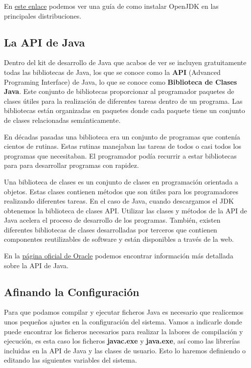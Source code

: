 En \href{https://www.muylinux.com/2021/03/23/adoptium-working-group-adoptopenjdk-eclipse-foundation-openjdk/}{este enlace} podemos ver una guía de como instalar OpenJDK en las principales distribuciones.

\subsection{La API de Java}
Dentro del kit de desarrollo de Java que acabos de ver se incluyen gratuitamente todas las bibliotecas de Java, los que se conoce como la \textbf{API} (Advanced Programing Interface) de Java, lo que se conoce como \textbf{Biblioteca de Clases Java}. Este conjunto de bibliotecas proporcionar al programador paquetes de clases útiles para la realización de diferentes tareas dentro de un programa. Las bibliotecas están organizadas en paquetes donde cada paquete tiene un conjunto de clases relacionadas semánticamente.

En décadas pasadas una biblioteca era un conjunto de programas que contenía cientos de rutinas. Estas rutinas manejaban las tareas de todos o casi todos los programas que necesitaban. El programador podía recurrir a estar bibliotecas para para desarrollar programas con rapidez.

Una biblioteca de clases es un conjunto de clases en programación orientada a objetos. Estas clases contienen métodos que son útiles para los programadores realizando diferentes tareas. En el caso de Java, cuando descargamos el JDK obtenemos la biblioteca de clases API. Utilizar las clases y métodos de la API de Java acelera el proceso de desarrollo de los programas. También, existen diferentes bibliotecas de clases desarrolladas por terceros que contienen componentes reutilizables de software y están disponibles a través de la web.

En la \href{https://docs.oracle.com/en/java/javase/index.html}{página oficial de Oracle} podemos encontrar información más detallada sobre la API de Java.

\subsection{Afinando la Configuración}
Para que podamos compilar y ejecutar ficheros Java es necesario que realicemos unos pequeños ajustes en la configuración del sistema. Vamos a indicarle donde puede encontrar los ficheros necesarios para realizar la labores de compilación y ejecución, es esta caso los ficheros \textbf{javac.exe} y \textbf{java.exe}, así como las librerías incluidas en la API de Java y las clases de usuario. Esto lo haremos definiendo o editando las siguientes variables del sistema.

